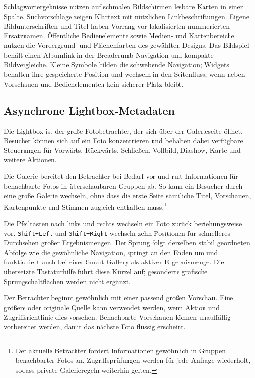 \documentclass[11pt,a4paper]{article}
\newcommand{\codeword}[1]{\nolinkurl{#1}}
\begin{document}
Schlagwortergebnisse nutzen auf schmalen Bildschirmen lesbare Karten in
einer Spalte. Suchvorschläge zeigen Klartext mit nützlichen Linkbeschriftungen.
Eigene Bildunterschriften und Titel haben Vorrang vor lokalisierten
nummerierten Ersatznamen. Öffentliche Bedienelemente sowie Medien- und
Kartenbereiche nutzen die Vordergrund- und Flächenfarben des gewählten
Designs. Das Bildspiel behält einen Albumlink in der Breadcrumb-Navigation
und kompakte Bildvergleiche. Kleine Symbole bilden die schwebende Navigation;
Widgets behalten ihre gespeicherte Position und wechseln in den Seitenfluss,
wenn neben Vorschauen und Bedienelementen kein sicherer Platz bleibt.

\subsection{Asynchrone Lightbox-Metadaten}

Die Lightbox ist der große Fotobetrachter, der sich über der Galerieseite
öffnet. Besucher können sich auf ein Foto konzentrieren und behalten dabei
verfügbare Steuerungen für Vorwärts, Rückwärts, Schließen, Vollbild, Diashow,
Karte und weitere Aktionen.

Die Galerie bereitet den Betrachter bei Bedarf vor und ruft Informationen für
benachbarte Fotos in überschaubaren Gruppen ab. So kann ein Besucher durch eine
große Galerie wechseln, ohne dass die erste Seite sämtliche Titel, Vorschauen,
Kartenpunkte und Stimmen zugleich enthalten muss.\footnote{Der aktuelle
Betrachter fordert Informationen gewöhnlich in Gruppen benachbarter Fotos an.
Zugriffsprüfungen werden für jede Anfrage wiederholt, sodass private
Galerieregeln weiterhin gelten.}

Die Pfeiltasten nach links und rechts wechseln ein Foto zurück beziehungsweise
vor. \codeword{Shift+Left} und \codeword{Shift+Right} wechseln zehn Positionen
für schnelleres Durchsehen großer Ergebnismengen. Der Sprung folgt derselben
stabil geordneten Abfolge wie die gewöhnliche Navigation, springt an den Enden
um und funktioniert auch bei einer Smart Gallery als aktiver Ergebnismenge. Die
übersetzte Tastaturhilfe führt diese Kürzel auf; gesonderte grafische
Sprungschaltflächen werden nicht ergänzt.

Der Betrachter beginnt gewöhnlich mit einer passend großen Vorschau. Eine
größere oder originale Quelle kann verwendet werden, wenn Aktion und
Zugriffsrichtlinie dies vorsehen. Benachbarte Vorschauen können unauffällig
vorbereitet werden, damit das nächste Foto flüssig erscheint.
\end{document}
